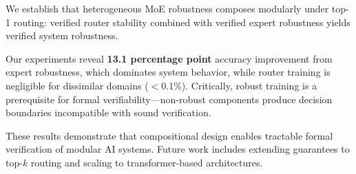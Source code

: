 \documentclass{article}
\theoremstyle{plain}
\theoremstyle{remark}
\begin{document}
We establish that heterogeneous MoE robustness composes modularly under top-1 routing: verified router stability combined with verified expert robustness yields verified system robustness.

Our experiments reveal \textbf{13.1 percentage point} accuracy improvement from expert robustness, which dominates system behavior, while router training is negligible for dissimilar domains ($<$0.1\%). Critically, robust training is a prerequisite for formal verifiability---non-robust components produce decision boundaries incompatible with sound verification.

These results demonstrate that compositional design enables tractable formal verification of modular AI systems. Future work includes extending guarantees to top-$k$ routing and scaling to transformer-based architectures.

% 
% 
\end{document}
